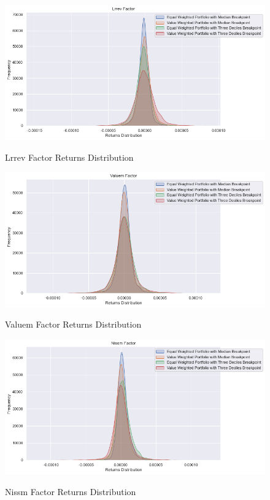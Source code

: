 \begin{figure}[H]
	\caption{Lrrev Factor Returns Distribution}
	\centering
	\includegraphics[scale=.63]{../../output/figures/lrrev.png}
	\label{fig:lrrev}
\end{figure}

\begin{figure}[H]
	\caption{Valuem Factor Returns Distribution}
	\centering
	\includegraphics[scale=.63]{../../output/figures/valuem.png}
	\label{fig:valuem}
\end{figure}

\begin{figure}[H]
	\caption{Nissm Factor Returns Distribution}
	\centering
	\includegraphics[scale=.63]{../../output/figures/nissm.png}
	\label{fig:nissm}
\end{figure}

